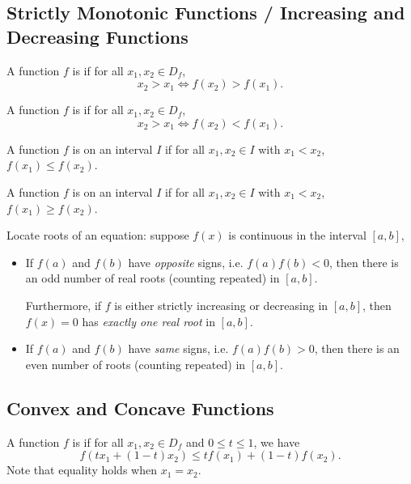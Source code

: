 \subsection{Strictly Monotonic Functions / Increasing and Decreasing Functions}
\begin{definition}
A function $f$ is  if for all $x_1,x_2\in D_f$,
\[ x_2>x_1\iff f(x_2)>f(x_1). \]
\end{definition}

\begin{definition}
A function $f$ is  if for all $x_1,x_2\in D_f$,
\[ x_2>x_1\iff f(x_2)<f(x_1). \]
\end{definition}

\begin{definition}
A function $f$ is  on an interval $I$ if for all $x_1,x_2\in I$ with $x_1<x_2$, $f(x_1)\le f(x_2)$.
\end{definition}

\begin{definition}
A function $f$ is  on an interval $I$ if for all $x_1,x_2\in I$ with $x_1<x_2$, $f(x_1)\ge f(x_2)$.
\end{definition}

Locate roots of an equation: suppose $f(x)$ is continuous in the interval $[a,b]$,
\begin{itemize}
\item If $f(a)$ and $f(b)$ have \emph{opposite} signs, i.e. $f(a)f(b)<0$, then there is an odd number of real roots (counting repeated) in $[a,b]$.

Furthermore, if $f$ is either strictly increasing or decreasing in $[a,b]$, then $f(x)=0$ has \emph{exactly one real root} in $[a,b]$.

\item If $f(a)$ and $f(b)$ have \emph{same} signs, i.e. $f(a)f(b)>0$, then there is an even number of roots (counting repeated) in $[a,b]$.
\end{itemize}

\subsection{Convex and Concave Functions}
\begin{definition}
A function $f$ is  if for all $x_1,x_2\in D_f$ and $0\le t\le 1$, we have
\[ f(tx_1+(1-t)x_2)\le tf(x_1)+(1-t)f(x_2). \]
Note that equality holds when $x_1=x_2$.
\end{definition}

